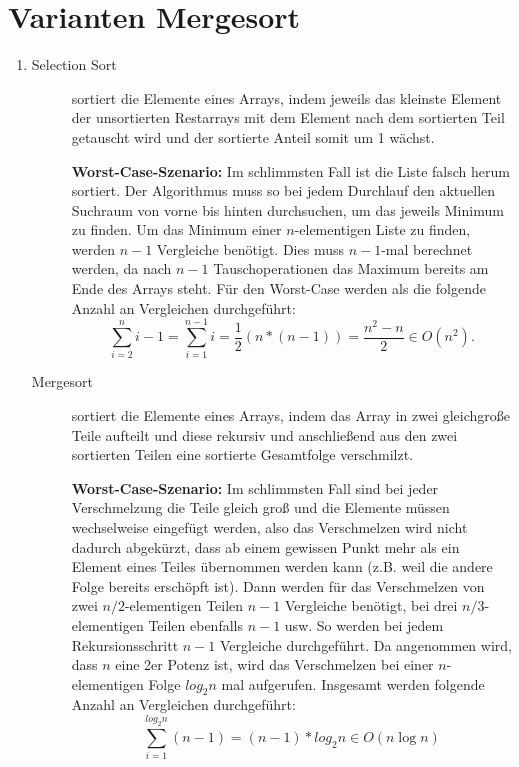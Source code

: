\documentclass[a4paper,10pt]{scrartcl}
\begin{document}
\section{Varianten Mergesort}
\begin{enumerate}
\item \begin{description}
       \item[Selection Sort] sortiert die Elemente eines Arrays, indem jeweils das kleinste Element der unsortierten Restarrays mit dem Element nach dem sortierten Teil getauscht wird und der sortierte Anteil somit um 1 wächst.

\textbf{Worst-Case-Szenario:} Im schlimmsten Fall ist die Liste falsch
herum sortiert. Der Algorithmus muss so bei jedem Durchlauf den aktuellen
Suchraum von vorne bis hinten durchsuchen, um das jeweils Minimum zu finden. Um das Minimum einer $n$-elementigen Liste zu finden, werden $n-1$ Vergleiche benötigt. Dies muss $n-1$-mal
berechnet werden, da nach $n-1$ Tauschoperationen das Maximum bereits am Ende des Arrays steht. Für den Worst-Case werden als die folgende Anzahl an Vergleichen durchgeführt:
\[
 \sum\limits_{i = 2}^{n} i - 1 = \sum\limits_{i = 1}^{n - 1} i = \frac{1}{2} \left(n * (n - 1)\right) = \frac{n^2 - n}{2} \in O(n^2).
\]


       \item[Mergesort] sortiert die Elemente eines Arrays, indem das Array in zwei gleichgroße Teile aufteilt und diese rekursiv und anschließend aus den zwei sortierten Teilen eine sortierte Gesamtfolge verschmilzt.

\textbf{Worst-Case-Szenario:} Im schlimmsten Fall sind bei jeder Verschmelzung die Teile gleich groß und die Elemente müssen wechselweise eingefügt werden, also das Verschmelzen wird nicht dadurch abgekürzt, dass ab einem gewissen Punkt
mehr als ein Element eines Teiles übernommen werden kann (z.B. weil die andere Folge bereits erschöpft ist).
Dann werden für das Verschmelzen von zwei $n/2$-elementigen Teilen $n - 1$ Vergleiche benötigt, bei drei $n/3$-elementigen Teilen ebenfalls $n - 1$ usw.
So werden bei jedem Rekursionsschritt $n - 1$ Vergleiche durchgeführt.
Da angenommen wird, dass $n$ eine 2er Potenz ist, wird das Verschmelzen bei einer $n$-elementigen Folge $log_2 n$ mal aufgerufen. Insgesamt werden folgende Anzahl an Vergleichen durchgeführt:
\begin{equation*}
 \sum\limits_{i = 1}^{log_2 n} (n - 1) = (n - 1)  * log_2 n \in O(n \log n)
\end{equation*}


\end{description}
\end{enumerate}
\end{document}
